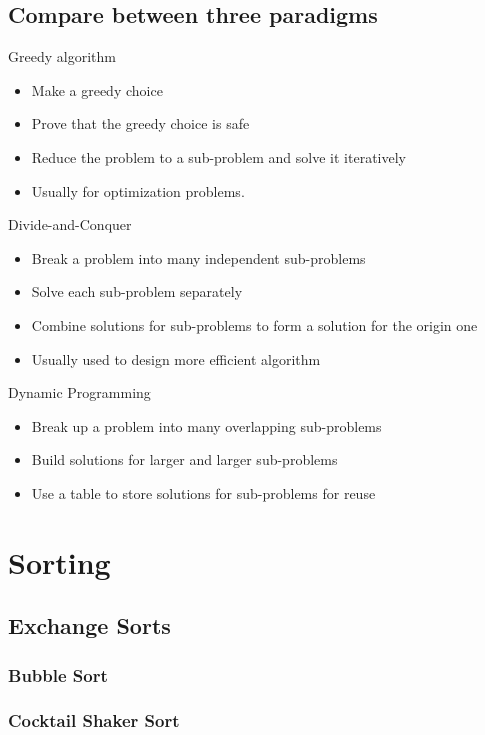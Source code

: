 		\section{Compare between three paradigms}
			Greedy algorithm
			\begin{itemize}
				\item Make a greedy choice
				\item Prove that the greedy choice is safe
				\item Reduce the problem to a sub-problem and solve it iteratively
				\item Usually for optimization problems.
			\end{itemize}

			Divide-and-Conquer
			\begin{itemize}
				\item Break a problem into many independent sub-problems
				\item Solve each sub-problem separately
				\item Combine solutions for sub-problems to form a solution for the origin one
				\item Usually used to design more efficient algorithm
			\end{itemize}

			Dynamic Programming
			\begin{itemize}
				\item Break up a problem into many overlapping sub-problems
				\item Build solutions for larger and larger sub-problems
				\item Use a table to store solutions for sub-problems for reuse
			\end{itemize}

	\chapter{Sorting}
		\section{Exchange Sorts}
			\subsection{Bubble Sort}

			\subsection{Cocktail Shaker Sort}

